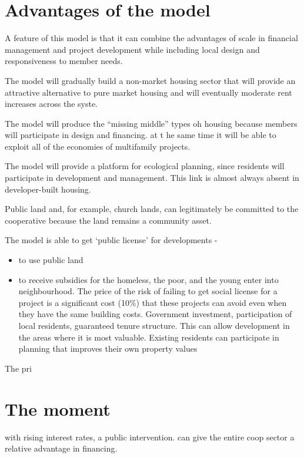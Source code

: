      
\section{Advantages of the model}

A feature of this model is that it can combine the advantages of scale in financial management and project development while including local design and responsiveness to member needs.

The model will gradually build a non-market housing  sector that will provide an attractive alternative to pure market housing and will eventually moderate rent increases across the syste.

The model will produce the ``missing middle'' types oh housing because members will participate in design and financing. at t he same time it will be able to exploit  all of the economies of multifamily projects. 

The model will provide a platform for ecological planning, since residents will participate in development and management. This link is almost always absent in developer-built housing.

Public land and, for example, church lands, can legitimately be committed to the cooperative because the land remains a community asset.

The model is able to get `public license' for developments - \begin{itemize}
    \item to use public land
    \item to receive subsidies for the homeless, the poor, and the young
    \to enter into neighbourhood. The price of the risk of failing to get social license for a project is a significant cost (10\%) that these projects can avoid even when they have the same building costs.  Government investment, participation of local residents, guaranteed  tenure structure. This can allow development in the areas where it is most valuable. Existing residents can participate in planning that improves their own property values
\end{itemize}
The pri
\section{The moment}
with rising interest rates, a public intervention. can give the entire coop sector a relative advantage in financing. 






